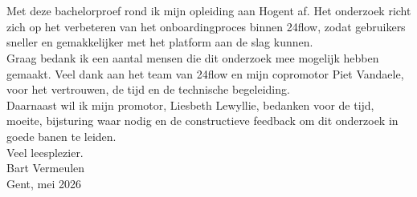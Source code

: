 
\chapter*{}%
\label{ch:voorwoord}
Met deze bachelorproef rond ik mijn opleiding aan Hogent af. Het onderzoek richt zich op het verbeteren van het onboardingproces binnen 24flow, zodat gebruikers sneller en gemakkelijker met het platform aan de slag kunnen.
\\

Graag bedank ik een aantal mensen die dit onderzoek mee mogelijk hebben gemaakt. Veel dank aan het team van 24flow en mijn copromotor Piet Vandaele, voor het vertrouwen, de tijd en de technische begeleiding.
\\

Daarnaast wil ik mijn promotor, Liesbeth Lewyllie, bedanken voor de tijd, moeite, bijsturing waar nodig en de constructieve feedback om dit onderzoek in goede banen te leiden.
\\


Veel leesplezier.
\\

Bart Vermeulen
\\
Gent, mei 2026

